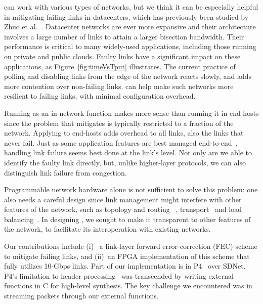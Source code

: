 \OurSys can work with various types of networks, but we think it can be
especially helpful in mitigating failing links in datacenters, which has
previously been studied by Zhuo et al.~\cite{Zhuo:2017:UMP:3098822.3098849}.
Datacenter networks are ever more expansive and their architecture involves a
large number of links to attain a larger bisection bandwidth. Their
performance is critical to many widely-used applications, including those
running on private and public clouds. Faulty  links have a significant impact
on these applications, as Figure~\ref{fig:timeVsTput}  illustrates. The
current practice of polling and disabling links from the edge of the network
reacts slowly, and adds more contention over non-failing links. \OurSys can help
make such networks more resilient to failing links, with minimal configuration
overhead.

Running \OurSys as an in-network function makes more sense than
running it in end-hosts since the problem that \OurSys mitigates is
typically restricted to a fraction of the network.  Applying \OurSys to
end-hosts adds overhead to all links, also the links that never fail.
Just as some application features are
best managed end-to-end~\cite{Saltzer84end-to-endarguments}, handling
link failure seems best done at the link's level. Not only are we able to
identify the faulty link directly, but, unlike higher-layer protocols,
we can also distinguish link failure from congestion.

Programmable network hardware alone is not sufficient to solve this problem: one
also needs a careful design since link management might interfere with
other features of the network, such as topology and routing~
\cite{Greenberg:2011:VSF:1897852.1897877},
transport~\cite{Raiciu:2011:IDP:2043164.2018467} %
and load balancing~\cite{Alizadeh:2014:CDC:2740070.2626316}.
In designing \OurSys, we sought to make it transparent to other
features of the network, to facilitate its interoperation with
existing networks.

Our contributions include (i)~
a link-layer forward error-correction (FEC) scheme to mitigate failing
links, and (ii)~an FPGA implementation of this scheme that fully utilizes 10-Gbps
links. Part of our implementation is in
P4~\cite{Bosshart:2014:PPP:2656877.2656890} over SDNet.
P4's limitation to header processing~\cite{Dang:2017:WPL:3050220.3050231}
was transcended by writing external functions in C for high-level synthesis.
The key challenge we encountered was in streaming packets through our
external functions.%

